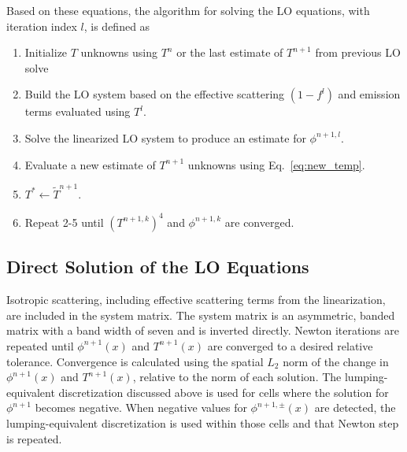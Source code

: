 Based on these equations, the algorithm for solving the LO equations, with iteration index
$l$, is defined as
\begin{enumerate}
    \item Initialize $T$ unknowns using $T^n$ or the last estimate of $T^{n+1}$ from
        previous LO solve
    \item  Build the LO system based on the effective scattering $(1-f^l)$ and emission terms
          evaluated using $T^l$.
    \item Solve the linearized LO system to produce an estimate for $\phi^{n+1,l}$.
    \item Evaluate a new estimate of $T^{n+1}$ unknowns using Eq.~\eqref{eq:new_temp}.
    \item $T^*\leftarrow\tilde{T}^{n+1}$.
    \item Repeat 2-5 until $(T^{n+1,k})^4$ and $\phi^{n+1,k}$ are converged.
\end{enumerate}

\subsection{Direct Solution of the LO Equations}

Isotropic scattering,
including effective scattering terms from the linearization, are included in the system matrix. The system
matrix is an asymmetric, banded matrix with a band width of seven and is inverted
directly. 
Newton iterations are repeated until $\phi^{n+1}(x)$ and $T^{n+1}(x)$ are converged
to a desired relative tolerance.  Convergence is calculated using the spatial $L_2$
norm of the change in $\phi^{n+1}(x)$ and $T^{n+1}(x)$, relative to the norm of each
solution.  The lumping-equivalent discretization
discussed above is used for cells where the solution for
$\phi^{n+1}$ becomes negative. When negative values for $\phi^{n+1,\pm}(x)$ are detected, the lumping-equivalent discretization is used within
those cells and that Newton step is repeated. 


